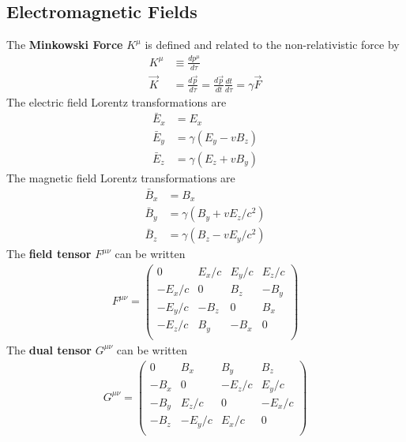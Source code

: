 \begin{multicols}{2}
\subsection{Electromagnetic Fields}
The \textbf{Minkowski Force} $K^\mu$ is defined and related to the non-relativistic force by
\begin{align}
	K^\mu &\equiv \frac{dp^\mu}{d\tau} \\
	\vec{K} &= \frac{d\vec{p}}{d\tau} =\frac{d\vec{p}}{dt}\frac{dt}{d\tau} =  \gamma \vec{F}
\end{align}
The electric field Lorentz transformations are
\begin{align}
	\bar{E}_x &= E_x \\
	\bar{E}_y &= \gamma (E_y - vB_z) \\
	\bar{E}_z &= \gamma (E_z+vB_y)
\end{align}
The magnetic field Lorentz transformations are
	\begin{align}
	\bar{B}_x &= B_x \\
	\bar{B}_y &= \gamma (B_y + vE_z/c^2) \\
	\bar{B}_z &= \gamma (B_z-vE_y/c^2)
	\end{align}
The \textbf{field tensor} $F^{\mu\nu}$ can be written
\begin{align}
F^{\mu\nu} = \left(
\begin{array}{cccc}
0 & E_x/c & E_y/c & E_z/c\\
-E_x/c & 0 & B_z & -B_y\\
-E_y/c & -B_z & 0 & B_x\\
-E_z/c & B_y & -B_x & 0\\
\end{array}
\right) 
\end{align}
The \textbf{dual tensor} $G^{\mu\nu}$ can be written
\begin{align}
G^{\mu\nu}=\left(
\begin{array}{cccc}
0 & B_x & B_y & B_z\\
-B_x & 0 & -E_z/c & E_y/c\\
-B_y & E_z/c & 0 & -E_x/c\\
-B_z & -E_y/c & E_x/c & 0\\
\end{array}
\right)
\end{align}
\end{multicols}
